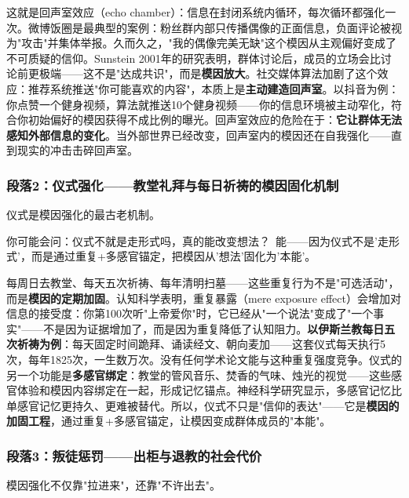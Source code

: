 \documentclass[../main.tex]{subfiles}
\begin{document}
这就是回声室效应（echo chamber）：信息在封闭系统内循环，每次循环都强化一次。微博饭圈是最典型的案例：粉丝群内部只传播偶像的正面信息，负面评论被视为"攻击"并集体举报。久而久之，"我的偶像完美无缺"这个模因从主观偏好变成了不可质疑的信仰。Sunstein 2001年的研究表明，群体讨论后，成员的立场会比讨论前更极端——这不是"达成共识"，而是\textbf{模因放大}。社交媒体算法加剧了这个效应：推荐系统推送"你可能喜欢的内容"，本质上是\textbf{主动建造回声室}。以抖音为例：你点赞一个健身视频，算法就推送10个健身视频——你的信息环境被主动窄化，符合你初始偏好的模因获得不成比例的曝光。回声室效应的危险在于：\textbf{它让群体无法感知外部信息的变化}。当外部世界已经改变，回声室内的模因还在自我强化——直到现实的冲击击碎回声室。

	\subsubsection*{段落2：仪式强化——教堂礼拜与每日祈祷的模因固化机制}

	仪式是模因强化的最古老机制。

	\begin{tcolorbox}[colback=yellow!5, title=\textit{读者行为预测}]

		你可能会问：仪式不就是走形式吗，真的能改变想法？\ 能——因为仪式不是'走形式'，而是通过重复+多感官锚定，把模因从'想法'固化为'本能'。

	\end{tcolorbox}

每周日去教堂、每天五次祈祷、每年清明扫墓——这些重复行为不是"可选活动"，而是\textbf{模因的定期加固}。认知科学表明，重复暴露（mere exposure effect）会增加对信息的接受度：你第100次听"上帝爱你"时，它已经从"一个说法"变成了"一个事实"——不是因为证据增加了，而是因为重复降低了认知阻力。\textbf{以伊斯兰教每日五次祈祷为例}：每天固定时间跪拜、诵读经文、朝向麦加——这套仪式每天执行5次，每年1825次，一生数万次。没有任何学术论文能与这种重复强度竞争。仪式的另一个功能是\textbf{多感官绑定}：教堂的管风音乐、焚香的气味、烛光的视觉——这些感官体验和模因内容绑定在一起，形成记忆锚点。神经科学研究显示，多感官记忆比单感官记忆更持久、更难被替代。所以，仪式不只是"信仰的表达"——它是\textbf{模因的加固工程}，通过重复+多感官锚定，让模因变成群体成员的"本能"。

	\subsubsection*{段落3：叛徒惩罚——出柜与退教的社会代价}

	模因强化不仅靠"拉进来"，还靠"不许出去"。
\end{document}
